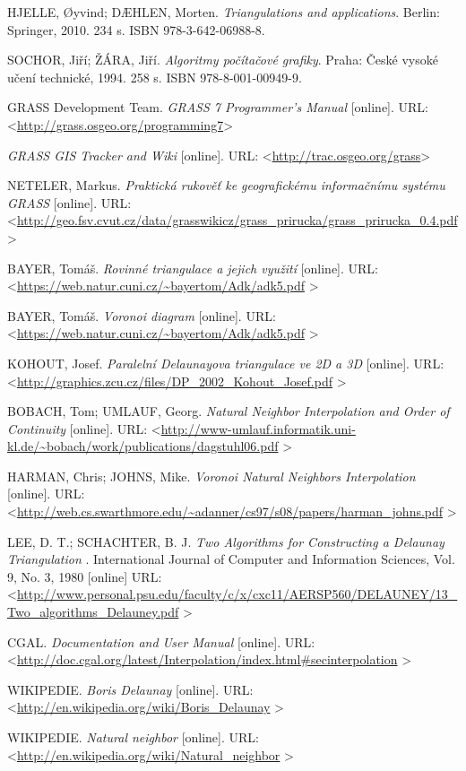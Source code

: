 \documentclass[12pt,a4paper]{article}
\begin{document}
\begin{thebibliography}{99}
\label{literatura}


HJELLE, Øyvind; DÆHLEN, Morten. \textit{Triangulations and applications}. Berlin: Springer, 2010. 234 s. ISBN 978-3-642-06988-8.


SOCHOR, Jiří; ŽÁRA, Jiří. \textit{Algoritmy počítačové grafiky}. Praha: České vysoké učení technické, 1994. 258 s. ISBN 978-8-001-00949-9.


GRASS Development Team. \textit{GRASS 7 Programmer's Manual} [online].
URL: \textless\url{http://grass.osgeo.org/programming7}\textgreater


\textit{GRASS GIS Tracker and Wiki} [online]. 
URL: \textless\url{http://trac.osgeo.org/grass}\textgreater


NETELER, Markus. \textit{Praktická rukověť ke geografickému informačnímu systému GRASS} [online].
URL: \textless\url{http://geo.fsv.cvut.cz/data/grasswikicz/grass_prirucka/grass_prirucka_0.4.pdf}
\textgreater

BAYER, Tomáš. \textit{Rovinné triangulace a jejich využití} [online].
URL: \textless\url{https://web.natur.cuni.cz/~bayertom/Adk/adk5.pdf}
\textgreater

BAYER, Tomáš. \textit{Voronoi diagram} [online].
URL: \textless\url{https://web.natur.cuni.cz/~bayertom/Adk/adk5.pdf}
\textgreater

KOHOUT, Josef. \textit{Paralelní Delaunayova triangulace
ve 2D a 3D} [online].
URL: \textless\url{http://graphics.zcu.cz/files/DP_2002_Kohout_Josef.pdf}
\textgreater

BOBACH, Tom; UMLAUF, Georg. \textit{Natural Neighbor Interpolation and Order of Continuity} [online].
URL: \textless\url{http://www-umlauf.informatik.uni-kl.de/~bobach/work/publications/dagstuhl06.pdf}
\textgreater

HARMAN, Chris; JOHNS, Mike. \textit{Voronoi Natural Neighbors Interpolation} [online].
URL: \textless\url{http://web.cs.swarthmore.edu/~adanner/cs97/s08/papers/harman_johns.pdf}
\textgreater

LEE, D. T.; SCHACHTER, B. J. \textit{Two Algorithms for Constructing a Delaunay Triangulation }. 
International Journal of Computer and Information Sciences, Vol. 9, No. 3, 1980 [online]
URL: \textless\url{http://www.personal.psu.edu/faculty/c/x/cxc11/AERSP560/DELAUNEY/13_Two_algorithms_Delauney.pdf}
\textgreater

CGAL. \textit{Documentation and User Manual} [online].
URL: \textless\url{http://doc.cgal.org/latest/Interpolation/index.html#secinterpolation}
\textgreater

WIKIPEDIE. \textit{Boris Delaunay} [online].
URL: \textless\url{http://en.wikipedia.org/wiki/Boris_Delaunay}
\textgreater

WIKIPEDIE. \textit{Natural neighbor} [online].
URL: \textless\url{http://en.wikipedia.org/wiki/Natural_neighbor}
\textgreater
\end{thebibliography}
\end{document}
